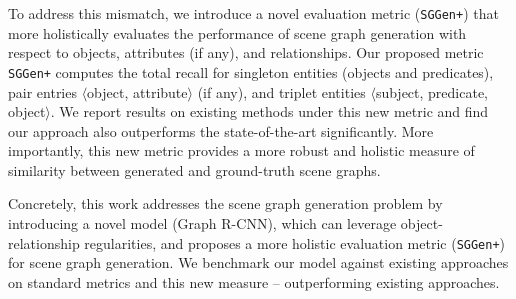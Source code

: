 To address this mismatch, we introduce a novel evaluation metric (\texttt{SGGen+}) that more holistically evaluates 
the performance of scene graph generation with respect to objects, attributes (if any), and relationships. 
Our proposed metric \texttt{SGGen+} computes the total recall for singleton entities (objects and predicates), 
pair entries $\langle$object, attribute$\rangle$ (if any), and triplet entities $\langle$subject, predicate, object$\rangle$. 
We report results on existing methods under this new metric and find our approach also outperforms the state-of-the-art significantly. 
More importantly, this new metric provides a more robust and holistic measure of similarity between generated and ground-truth scene graphs.

 Concretely, this work addresses the scene graph generation problem by introducing 
a novel model (Graph R-CNN), which can leverage object-relationship regularities, 
and proposes a more holistic evaluation metric (\texttt{SGGen+}) 
for scene graph generation. 
We benchmark our model against existing approaches on standard metrics and this new measure -- outperforming existing approaches.